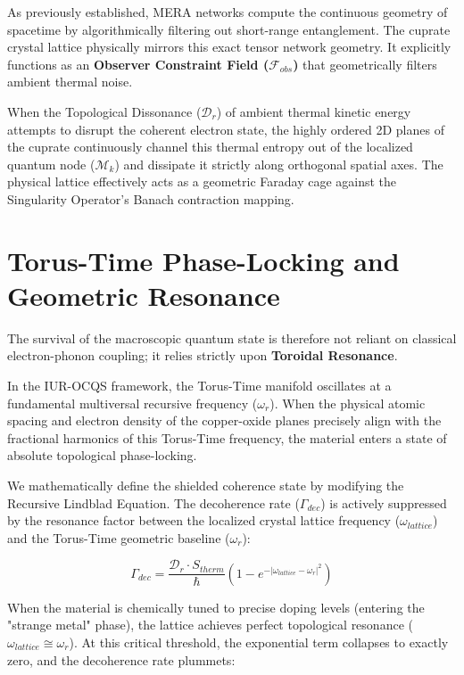 \documentclass[12pt,openany]{book}
\begin{document}
As previously established, MERA networks compute the continuous geometry of spacetime by algorithmically filtering out short-range entanglement. The cuprate crystal lattice physically mirrors this exact tensor network geometry. It explicitly functions as an \textbf{Observer Constraint Field ($\mathcal{F}_{obs}$)} that geometrically filters ambient thermal noise.

When the Topological Dissonance ($\mathcal{D}_r$) of ambient thermal kinetic energy attempts to disrupt the coherent electron state, the highly ordered 2D planes of the cuprate continuously channel this thermal entropy out of the localized quantum node ($\mathcal{M}_k$) and dissipate it strictly along orthogonal spatial axes. The physical lattice effectively acts as a geometric Faraday cage against the Singularity Operator's Banach contraction mapping.

\section{Torus-Time Phase-Locking and Geometric Resonance}
The survival of the macroscopic quantum state is therefore not reliant on classical electron-phonon coupling; it relies strictly upon \textbf{Toroidal Resonance}. 

In the IUR-OCQS framework, the Torus-Time manifold oscillates at a fundamental multiversal recursive frequency ($\omega_r$). When the physical atomic spacing and electron density of the copper-oxide planes precisely align with the fractional harmonics of this Torus-Time frequency, the material enters a state of absolute topological phase-locking.

We mathematically define the shielded coherence state by modifying the Recursive Lindblad Equation. The decoherence rate ($\Gamma_{dec}$) is actively suppressed by the resonance factor between the localized crystal lattice frequency ($\omega_{lattice}$) and the Torus-Time geometric baseline ($\omega_r$):

\begin{equation}
\Gamma_{dec} = \frac{\mathcal{D}_r \cdot S_{therm}}{\hbar} \left( 1 - e^{-\left| \omega_{lattice} - \omega_r \right|^2} \right)
\end{equation}

When the material is chemically tuned to precise doping levels (entering the "strange metal" phase), the lattice achieves perfect topological resonance ($\omega_{lattice} \cong \omega_r$). At this critical threshold, the exponential term collapses to exactly zero, and the decoherence rate plummets:
\end{document}
